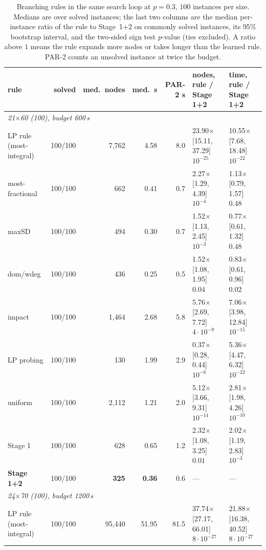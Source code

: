 \begin{table}[t]
\centering
\caption{Branching rules in the same search loop at $p=0.3$, $100$ instances per size. Medians are over solved instances; the last two columns are the median per-instance ratio of the rule to Stage~1+2 on commonly solved instances, its $95\%$ bootstrap interval, and the two-sided sign test $p$-value (ties excluded). A ratio above $1$ means the rule expands more nodes or takes longer than the learned rule. PAR-2 counts an unsolved instance at twice the budget.}
\label{tab:rq1}
\footnotesize
\begin{tabular}{lrrrrll}
\toprule
rule & solved & med.\ nodes & med.\ s & PAR-2 s & nodes, rule / Stage 1+2 & time, rule / Stage 1+2 \\
\midrule
\multicolumn{7}{l}{\emph{21$\times$60 (100), budget 600\,s}} \\
LP rule (most-integral) & 100/100 & 7,762 & 4.58 & 8.0 & 23.90$\times$ [15.11, 37.29] $10^{-25}$ & 10.55$\times$ [7.68, 18.48] $10^{-22}$ \\
most-fractional & 100/100 & 662 & 0.41 & 0.7 & 2.27$\times$ [1.29, 4.39] $10^{-4}$ & 1.13$\times$ [0.79, 1.57] $0.48$ \\
maxSD & 100/100 & 494 & 0.30 & 0.7 & 1.52$\times$ [1.13, 2.45] $10^{-3}$ & 0.77$\times$ [0.61, 1.32] $0.48$ \\
dom/wdeg & 100/100 & 436 & 0.25 & 0.5 & 1.52$\times$ [1.08, 1.95] $0.04$ & 0.83$\times$ [0.61, 0.96] $0.02$ \\
impact & 100/100 & 1,464 & 2.68 & 5.8 & 5.76$\times$ [2.69, 7.72] $4\cdot10^{-9}$ & 7.06$\times$ [3.98, 12.84] $10^{-15}$ \\
LP probing & 100/100 & 130 & 1.99 & 2.9 & 0.37$\times$ [0.28, 0.44] $10^{-6}$ & 5.36$\times$ [4.47, 6.32] $10^{-22}$ \\
uniform & 100/100 & 2,112 & 1.21 & 2.0 & 5.12$\times$ [3.66, 9.31] $10^{-14}$ & 2.81$\times$ [1.98, 4.26] $10^{-10}$ \\
Stage 1 & 100/100 & 628 & 0.65 & 1.2 & 2.32$\times$ [1.08, 3.25] $0.01$ & 2.02$\times$ [1.19, 2.83] $10^{-3}$ \\
\textbf{Stage 1+2} & 100/100 & \textbf{325} & \textbf{0.36} & 0.6 & --- & --- \\
\midrule
\multicolumn{7}{l}{\emph{24$\times$70 (100), budget 1200\,s}} \\
LP rule (most-integral) & 100/100 & 95,440 & 51.95 & 81.5 & 37.74$\times$ [27.17, 66.01] $8\cdot10^{-27}$ & 21.88$\times$ [16.38, 40.52] $8\cdot10^{-27}$ \\

\end{tabular}
\end{table}
